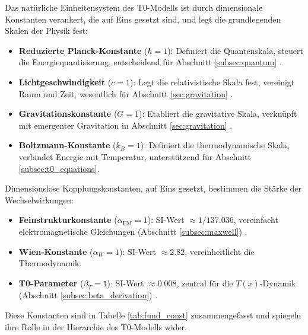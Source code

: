 \documentclass[12pt,a4paper]{article}
\newcommand{\Tfield}{T(x)}
\begin{document}
	Das natürliche Einheitensystem des T0-Modells ist durch dimensionale Konstanten verankert, die auf Eins gesetzt sind, und legt die grundlegenden Skalen der Physik fest:
	\begin{itemize}
		\item \textbf{Reduzierte Planck-Konstante} (\(\hbar = 1\)): Definiert die Quantenskala, steuert die Energiequantisierung, entscheidend für Abschnitt \ref{subsec:quantum} \cite{Planck1899}.
		\item \textbf{Lichtgeschwindigkeit} (\(c = 1\)): Legt die relativistische Skala fest, vereinigt Raum und Zeit, wesentlich für Abschnitt \ref{sec:gravitation} \cite{Einstein1905}.
		\item \textbf{Gravitationskonstante} (\(G = 1\)): Etabliert die gravitative Skala, verknüpft mit emergenter Gravitation in Abschnitt \ref{sec:gravitation} \cite{Einstein1915}.
		\item \textbf{Boltzmann-Konstante} (\(k_B = 1\)): Definiert die thermodynamische Skala, verbindet Energie mit Temperatur, unterstützend für Abschnitt \ref{subsec:t0_equations}.
	\end{itemize}
	
	Dimensionslose Kopplungskonstanten, auf Eins gesetzt, bestimmen die Stärke der Wechselwirkungen:
	\begin{itemize}
		\item \textbf{Feinstrukturkonstante} (\(\alpha_{\text{EM}} = 1\)): SI-Wert \(\approx 1/137.036\), vereinfacht elektromagnetische Gleichungen (Abschnitt \ref{subsec:maxwell}) \cite{pascher_alpha_2025}.
		\item \textbf{Wien-Konstante} (\(\alpha_W = 1\)): SI-Wert \(\approx 2.82\), vereinheitlicht die Thermodynamik.
		\item \textbf{T0-Parameter} (\(\beta_T = 1\)): SI-Wert \(\approx 0.008\), zentral für die \(\Tfield\)-Dynamik (Abschnitt \ref{subsec:beta_derivation}) \cite{pascher_beta_2025}.
	\end{itemize}
	
	Diese Konstanten sind in Tabelle \ref{tab:fund_const} zusammengefasst und spiegeln ihre Rolle in der Hierarchie des T0-Modells wider.
	
\end{document}

